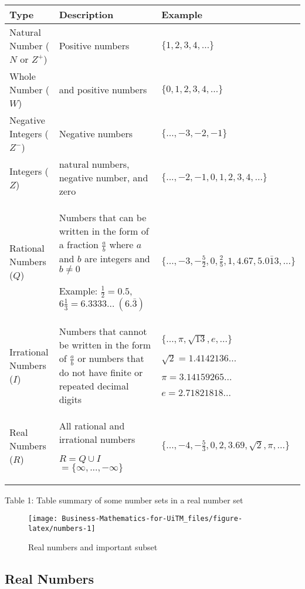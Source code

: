 \documentclass[
]{book}
\begin{document}
\begin{longtable}[]{@{}
  >{\raggedright\arraybackslash}p{}
  >{\raggedright\arraybackslash}p{}
  >{\raggedright\arraybackslash}p{}@{}}
\toprule
Type & Description & Example \\
\midrule
\endhead
Natural Number (\(N\) or \(Z^+\)) & Positive numbers & \(\{1,2,3,4,…\}\) \\
Whole Number (\(W\)) & 0 and positive numbers & \(\{0,1,2,3,4,…\}\) \\
Negative Integers (\(Z^-\)) & Negative numbers & \(\{…, -3,-2,-1\}\) \\
Integers (\(Z\)) & natural numbers, negative number, and zero & \(\{...,-2,-1,0,1,2,3,4,…\}\) \\
Rational Numbers (\(Q\)) & Numbers that can be written in the form of a fraction \(\frac{a}{b}\) where \(a\) and \(b\) are integers and \(b\ne0\)

Example: \(\frac{1}{2}=0.5\), \(6\frac{1}{3}=6.3333…\ (6.\bar{3})\) & \(\{ …,-3,-\frac{5}{2},0,\frac{2}{5},1,4.67,5.\bar{013}, …\}\) \\
Irrational Numbers (\(I\)) & Numbers that cannot be written in the form of \(\frac{a}{b}\) or numbers that do not have finite or repeated decimal digits & \(\{…,\pi,\sqrt{13},e,…\}\)

\(\sqrt{2}=1.4142136…\)

\(\pi=3.14159265…\)

\(e=2.71821818…\) \\
Real Numbers (\(R\)) & All rational and irrational numbers

\(R=Q\cup I\) \(= \{\infty ,..., -\infty \}\) & \(\{…,-4,-\frac{5}{3},0,2,3.69,\sqrt{2},\pi,…\}\) \\
\bottomrule
\end{longtable}

Table 1: Table summary of some number sets in a real number set

\begin{figure}

{\centering \texttt{[image: Business-Mathematics-for-UiTM\_files/figure-latex/numbers-1]} 

}

\caption{Real numbers and important subset}\label{fig:numbers}
\end{figure}

\hypertarget{real-numbers}{%
\subsection{Real Numbers}\label{real-numbers}}
\end{document}
